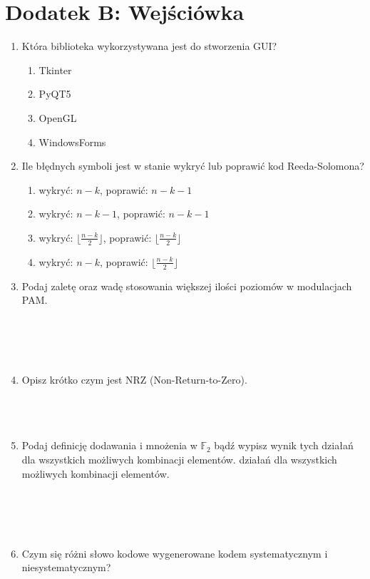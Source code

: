 \setcounter{secnumdepth}{0}
\section*{Dodatek B: Wejściówka}

\begin{enumerate}
    \item Która biblioteka wykorzystywana jest do stworzenia GUI?
    \begin{enumerate}[label=\Alph*)]
        \item Tkinter
        \item PyQT5
        \item OpenGL
        \item WindowsForms
    \end{enumerate}

    \item Ile błędnych symboli jest w stanie wykryć lub poprawić kod Reeda-Solomona?
    \begin{enumerate}[label=\Alph*)]
        \item wykryć: $n-k$, poprawić: $n-k-1$
        \item wykryć: $n-k-1$, poprawić: $n-k-1$
        \item wykryć: $\lfloor \frac{n-k}{2} \rfloor$, poprawić: $\lfloor \frac{n-k}{2} \rfloor$
        \item wykryć: $n-k$, poprawić: $\lfloor \frac{n-k}{2} \rfloor$
    \end{enumerate}
    \item Podaj zaletę oraz wadę stosowania większej ilości poziomów w modulacjach PAM.\\ \\ \\ \\ \\
    \item Opisz krótko czym jest NRZ (Non-Return-to-Zero).\\ \\ \\ \\
    \item Podaj definicję dodawania i mnożenia w $\mathbb{F}_2$ bądź wypisz wynik tych działań dla wszystkich możliwych kombinacji elementów.
    działań dla wszystkich możliwych kombinacji elementów.\\ \\ \\ \\ \\
    \item Czym się różni słowo kodowe wygenerowane kodem systematycznym i niesystematycznym?
\end{enumerate}

